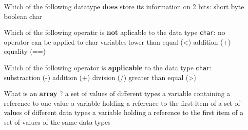 \begin{question}{
Which of the following datatype \textbf{does} store its information on 2 bits:
}
  \false short
  \false byte
  \true boolean
  \false char
\end{question}

\begin{question}{
Which of the following operatir is \textbf{not} aplicable to the data type \texttt{char}:
}
  \false no operator can be applied to char variables
  \false lower than equal (<)
  \true addition (+)
  \false equality (==)
\end{question}

\begin{question}{
Which of the following operator is \textbf{applicable} to the data type \texttt{char}:
}
  \false substraction (-)
  \false addition (+)
  \false division (/)
  \true greater than equal (>)
\end{question}

\begin{question}{
What is an \textbf{array} ?
}
  \false a set of values of different types
  \false a variable containing a reference to one value
  \false a variable holding a reference to the first item of a set of values of different data types
  \true a variable holding a reference to the first item of a set of values of the same data types
\end{question}
